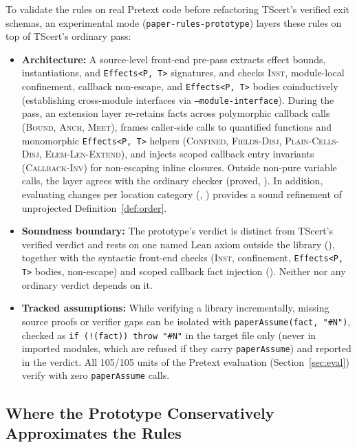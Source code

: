 \documentclass[10pt,a4paper]{article}
\newcommand{\ruleName}[1]{\textcolor{rulec}{\textsc{#1}}}
\theoremstyle{definition}
\newcommand{\code}[1]{\textcolor{codec}{\texttt{#1}}}
\begin{document}
To validate the rules on real Pretext code before refactoring TScert's
verified exit schemas, an experimental mode (\code{paper-rules-prototype})
layers these rules on top of TScert's ordinary pass:
\begin{itemize}[leftmargin=1.5em,itemsep=2pt]
\item \textbf{Architecture:} A source-level front-end pre-pass extracts
  effect bounds, instantiations, and \code{Effects<P, T>} signatures, and
  checks \ruleName{Inst}, module-local confinement, callback non-escape,
  and \code{Effects<P, T>} bodies coinductively (establishing cross-module
  interfaces via \code{--module-interface}). During the pass, an extension
  layer re-retains facts across polymorphic callback calls
  (\ruleName{Bound}, \ruleName{Anch}, \ruleName{Meet}), frames caller-side
  calls to quantified functions and monomorphic \code{Effects<P, T>}
  helpers (\ruleName{Confined}, \ruleName{Fields-Disj},
  \ruleName{Plain-Cells-Disj}, \ruleName{Elem-Len-Extend}), and injects
  scoped callback entry invariants (\ruleName{Callback-Inv}) for
  non-escaping inline closures. Outside non-pure variable calls, the layer
  agrees with the ordinary checker (proved, ). In
  addition, evaluating changes per location category
  (, ) provides a sound
  refinement of unprojected Definition~\ref{def:order}.
\item \textbf{Soundness boundary:} The prototype's verdict is distinct
  from TScert's verified verdict and rests on one named Lean axiom outside
  the  library (), together
  with the syntactic front-end checks (\ruleName{Inst}, confinement,
  \code{Effects<P, T>} bodies, non-escape) and scoped callback fact
  injection (). Neither  nor
  any ordinary verdict depends on it.
\item \textbf{Tracked assumptions:} While verifying a library
  incrementally, missing source proofs or verifier gaps can be isolated
  with \code{paperAssume(fact, "\#N")}, checked as
  \code{if (!(fact)) throw "\#N"} in the target file only (never in
  imported modules, which are refused if they carry \code{paperAssume})
  and reported in the verdict. All 105/105 units of the Pretext evaluation
  (Section~\ref{sec:eval}) verify with zero \code{paperAssume} calls.
\end{itemize}

\subsection{Where the Prototype Conservatively Approximates the Rules}
\end{document}
